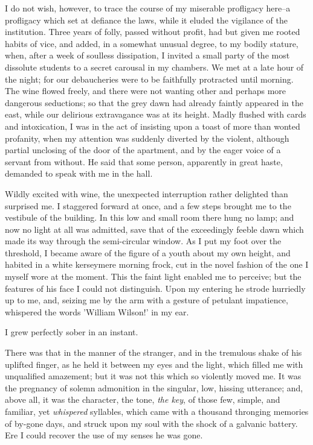 \documentclass[12pt]{article}
\begin{document}
     I do not wish, however, to trace the course of my miserable
profligacy here--a profligacy which set at defiance the laws, while
it eluded the vigilance of the institution.  Three years of folly,
passed without profit, had but given me rooted habits of vice, and
added, in a somewhat unusual degree, to my bodily stature, when,
after a week of soulless dissipation, I invited a small party of
the most dissolute students to a secret carousal in my chambers. 
We met at a late hour of the night; for our debaucheries were to be
faithfully protracted until morning.  The wine flowed freely, and
there were not wanting other and perhaps more dangerous 
seductions; so that the grey dawn had already faintly appeared in
the east, while our delirious extravagance was at its height. 
Madly flushed with cards and intoxication, I was in the act of
insisting upon a toast of more than wonted profanity, when my
attention was suddenly diverted by the violent, although partial
unclosing of the door of the apartment, and by the eager voice of
a servant from without.  He said that some person, apparently in
great haste, demanded to speak with me in the hall.

     Wildly excited with wine, the unexpected interruption rather
delighted than surprised me.  I staggered forward at once, and a
few steps brought me to the vestibule of the building.  In this low
and small room there hung no lamp; and now no light at all was
admitted, save that of the exceedingly feeble dawn which made its
way through the semi-circular window.  As I put my foot over the
threshold, I became aware of the figure of a youth about my own
height, and habited in a white kerseymere morning frock, cut in the
novel fashion of the one I myself wore at the moment.  This the
faint light enabled me to perceive; but the features of his face I
could not distinguish.  Upon my entering he strode hurriedly up to
me, and, seizing me by the arm with a gesture of petulant
impatience, whispered the words 'William Wilson!' in my ear.

     I grew perfectly sober in an instant.

     There was that in the manner of the stranger, and in the
tremulous shake of his uplifted finger, as he held it between my
eyes and the light, which filled me with unqualified amazement; but
it was not this which so violently moved me.  It was the pregnancy
of solemn admonition in the singular, low, hissing utterance; and,
above all, it was the character, the tone, \emph{the key}, of those
few, simple, and familiar, yet \emph{whispered} syllables, which came
with a thousand thronging memories of by-gone days, and struck upon
my soul with the shock of a galvanic battery.  Ere I could recover
the use of my senses he was gone.
\end{document}
